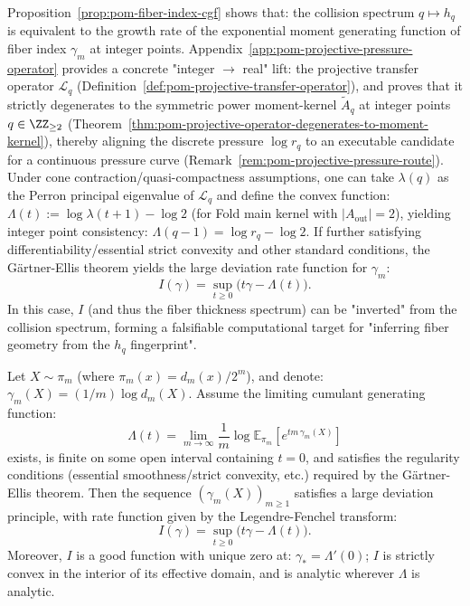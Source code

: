 \begin{remark}\label{rem:pom-fiber-index-ldp}
Proposition~\ref{prop:pom-fiber-index-cgf} shows that: the collision spectrum $q\mapsto h_q$ is equivalent to the growth rate of the exponential moment generating function of fiber index $\gamma_m$ at integer points.
Appendix~\ref{app:pom-projective-pressure-operator} provides a concrete "integer $\to$ real" lift: the projective transfer operator $\mathcal{L}_q$ (Definition~\ref{def:pom-projective-transfer-operator}), and proves that it strictly degenerates to the symmetric power moment-kernel $\widetilde A_q$ at integer points $q\in\ZZ_{\ge 2}$ (Theorem~\ref{thm:pom-projective-operator-degenerates-to-moment-kernel}), thereby aligning the discrete pressure $\log r_q$ to an executable candidate for a continuous pressure curve (Remark~\ref{rem:pom-projective-pressure-route}).
Under cone contraction/quasi-compactness assumptions, one can take $\lambda(q)$ as the Perron principal eigenvalue of $\mathcal{L}_q$ and define the convex function:
\(
\Lambda(t):=\log\lambda(t+1)-\log 2
\)
(for Fold main kernel with $|A_{\mathrm{out}}|=2$), yielding integer point consistency:
\(
\Lambda(q-1)=\log r_q-\log 2
\).
If further satisfying differentiability/essential strict convexity and other standard conditions, the Gärtner-Ellis theorem yields the large deviation rate function for $\gamma_m$:
\[
I(\gamma)=\sup_{t\ge 0}\bigl(t\gamma-\Lambda(t)\bigr).
\]
In this case, $I$ (and thus the fiber thickness spectrum) can be "inverted" from the collision spectrum, forming a falsifiable computational target for "inferring fiber geometry from the $h_q$ fingerprint".
\end{remark}

\begin{theorem}\label{thm:pom-fiber-index-ldp-thermo}
Let $X\sim\pi_m$ (where $\pi_m(x)=d_m(x)/2^m$), and denote:
\(
\gamma_m(X)=(1/m)\log d_m(X)
\).
Assume the limiting cumulant generating function:
\[
\Lambda(t)=\lim_{m\to\infty}\frac{1}{m}\log \mathbb{E}_{\pi_m}\!\left[e^{t m\,\gamma_m(X)}\right]
\]
exists, is finite on some open interval containing $t=0$, and satisfies the regularity conditions (essential smoothness/strict convexity, etc.) required by the Gärtner-Ellis theorem.
Then the sequence $(\gamma_m(X))_{m\ge 1}$ satisfies a large deviation principle, with rate function given by the Legendre-Fenchel transform:
\[
I(\gamma)=\sup_{t\ge 0}\bigl(t\gamma-\Lambda(t)\bigr).
\]
Moreover, $I$ is a good function with unique zero at:
\(
\gamma_\ast=\Lambda'(0)
\);
$I$ is strictly convex in the interior of its effective domain, and is analytic wherever $\Lambda$ is analytic.
\end{theorem}

